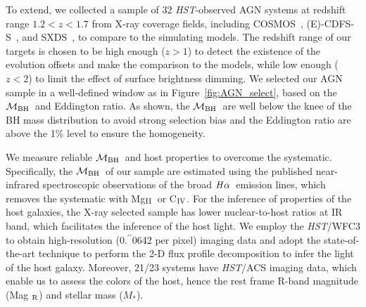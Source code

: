\documentclass{natureprintstyle}
\newcommand{\hst}{{\it HST}}
\newcommand{\mbh}{$\mathcal M_{\rm BH}$}
\newcommand{\mr}{Mag$_{\rm ~R}$}
\newcommand{\halpha}{${\it H}\alpha$}
\newcommand{\mstar}{{$M_*$}}
\newcommand{\Mgii}{Mg$_{\rm II}$}
\newcommand{\Civ}{C$_{\rm IV}$}
\newcommand{\farcs}{\mbox{\ensuremath{.\!\!^{\prime\prime}}}}%
\begin{document}

To extend, we collected a sample of 32 \hst-observed AGN systems at redshift range $1.2<z<1.7$ from X-ray coverage fields, including COSMOS~\cite{Civano2016}, (E)-CDFS-S~\cite{Lehmer2005, Xue2011}, and SXDS~\cite{Ueda2008}, to compare to the simulating models. The redshift range of our targets is chosen to be high enough ($z>1$) to detect the existence of the evolution offsets and make the comparison to the models, while low enough ($z<2$) to limit the effect of surface brightness dimming. We selected our AGN sample in a well-defined window as in Figure~\ref{fig:AGN_select}, based on the \mbh\ and Eddington ratio. As shown, the \mbh\ are well below the knee of the BH mass distribution to avoid strong selection bias and the Eddington ratio are above the 1\% level to ensure the homogeneity.

We measure reliable \mbh\ and host properties to overcome the systematic. Specifically, the \mbh\ of our sample are estimated using the published near-infrared spectroscopic observations of the broad \halpha\ emission lines, which removes the systematic with \Mgii\ or \Civ. For the inference of properties of the host galaxies, the X-ray selected sample has lower nuclear-to-host ratios at IR band, which facilitates the inference of the host light. We employ the \hst/WFC3 to obtain high-resolution (0\farcs0642 per pixel) imaging data and adopt the state-of-the-art technique to perform the 2-D flux profile decomposition to infer the light of the host galaxy. Moreover, 21/23 systems have \hst/ACS imaging data, which enable us to assess the colors of the host, hence the rest frame R-band magnitude (\mr) and stellar mass (\mstar). 
\end{document}

